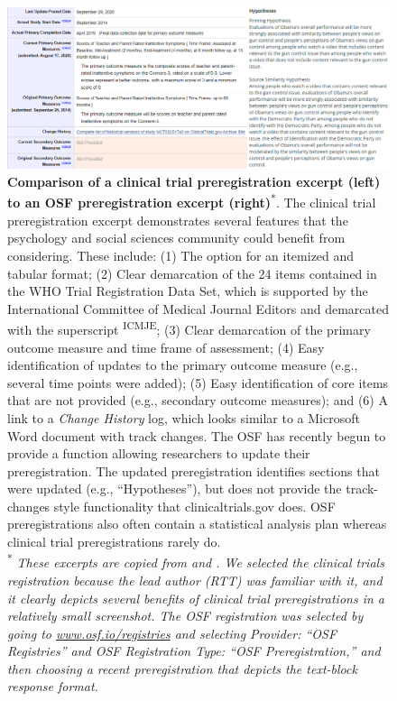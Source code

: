 \documentclass[authordate, meta]{jote-new-article}
\begin{document}
\begin{figure}[t]
  \begin{fullwidth}
    \label{fig:rId9}

    \includegraphics[width=\linewidth]{media/image4.png}

    \caption[check]{\textbf{Comparison of a clinical trial preregistration excerpt (left) to an OSF preregistration excerpt (right)}\protect\textsuperscript{*}. The clinical trial preregistration excerpt demonstrates several features that the psychology and social sciences community could benefit from considering. These include: (1) The option for an itemized and tabular format; (2) Clear demarcation of the 24 items contained in the WHO Trial Registration Data Set, which is supported by the International Committee of Medical Journal Editors and demarcated with the superscript \textsuperscript{ICMJE}; (3) Clear demarcation of the primary outcome measure and time frame of assessment; (4) Easy identification of updates to the primary outcome measure (e.g., several time points were added); (5) Easy identification of core items that are not provided (e.g., secondary outcome measures); and (6) A link to a \emph{Change History} log, which looks similar to a Microsoft Word document with track changes. The OSF has recently begun to provide a function allowing researchers to update their preregistration. The updated preregistration identifies sections that were updated (e.g., “Hypotheses”), but does not provide the track-changes style functionality that clinicaltrials.gov does. OSF preregistrations also often contain a statistical analysis plan whereas clinical trial preregistrations rarely do.\\  {\footnotesize\textsuperscript{*} \emph{These excerpts are copied from \parencites{Arnold2013} and \parencites{Berent2021}. We selected the clinical trials registration because the lead author (RTT) was familiar with it, and it clearly depicts several benefits of clinical trial preregistrations in a relatively small screenshot. The OSF registration was selected by going to \href{http://www.osf.io/registries}{www.osf.io/registries} and selecting \emph{Provider}: “OSF Registries” and \emph{OSF Registration Type}: “OSF Preregistration,” and then choosing a recent preregistration that depicts the text-block response format. }}}

  \end{fullwidth}
\end{figure}
\end{document}
